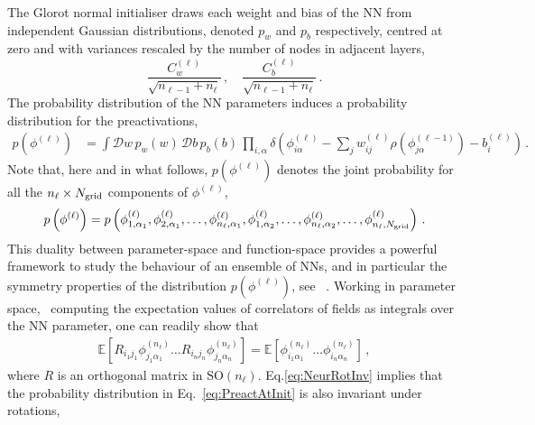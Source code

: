\documentclass[11pt]{article}
\begin{document}
The Glorot normal initialiser draws each weight and bias of the NN from independent Gaussian
distributions, denoted $p_w$ and $p_b$ respectively, centred at zero and with variances
rescaled by the number of nodes in adjacent layers,
\begin{equation}
    \label{eq:RescaledGlorotVariances}
    \frac{C^{(\ell)}_{w}}{\sqrt{n_{\ell-1} + n_{\ell}}}\, ,
    \quad \frac{C^{(\ell)}_{b}}{\sqrt{n_{\ell-1} + n_{\ell}}}\, .
\end{equation}
The probability distribution of the NN parameters induces a probability distribution for the
preactivations,
\begin{align}
    \label{eq:PreactAtInit}
    p\left(\phi^{(\ell)}\right)
      &= \int \mathcal{D}w\, p_w(w)\,
        \mathcal{D}b\, p_b(b)\, \prod_{i,\alpha}
        \delta\left(
          \phi^{(\ell)}_{i\alpha} - \sum_{j} w^{(\ell)}_{ij}
          \rho\left(\phi^{(\ell-1)}_{j\alpha}\right)
          - b^{(\ell)}_i
          \right)\, .
\end{align}
Note that, here and in what follows, $p(\phi^{(\ell)})$ denotes the joint probability for all the
$n_{\ell}\times N_{\mathrm{grid}}$ components of $\phi^{(\ell)}$,
\begin{align}
    \label{eq:ExplIndices}
    p\left(\phi^{(\ell)}\right) = p\left(\phi^{(\ell)}_{1,\alpha_1}, \phi^{(\ell)}_{2,\alpha_1}, \ldots,
        \phi^{(\ell)}_{n_\ell,\alpha_1}, \phi^{(\ell)}_{1,\alpha_2}, \ldots, \phi^{(\ell)}_{n_\ell,\alpha_2},
        \ldots,
        \phi^{(\ell)}_{n_\ell,N_{\mathrm{grid}}}\right)\, .
\end{align}
This duality between parameter-space and function-space provides a powerful framework to study
the behaviour of an ensemble of NNs, and in particular the symmetry properties of the distribution
$p(\phi^{(\ell)})$, see \eg~\cite{Maiti:2021fpy}. Working in parameter space, \ie\ computing the
expectation values of correlators of fields as integrals over the NN parameter, one can readily
show that
\begin{align}
    \label{eq:NeurRotInv}
    \mathbb{E}\left[
        R_{i_1j_1} \phi^{(n_\ell)}_{j_1 \alpha_1} \ldots
        R_{i_nj_n} \phi^{(n_\ell)}_{j_n \alpha_n}
    \right] =
    \mathbb{E}\left[
        \phi^{(n_\ell)}_{i_1 \alpha_1} \ldots
        \phi^{(n_\ell)}_{i_n \alpha_n}
    \right]\, ,
\end{align}
where $R$ is an orthogonal matrix in $\text{SO}(n_{\ell})$. Eq.\eqref{eq:NeurRotInv} implies
that the probability distribution in Eq.~\eqref{eq:PreactAtInit} is also invariant under rotations,
\end{document}
